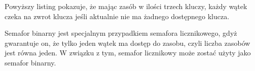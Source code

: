 \documentclass[12pt]{article}
\begin{document}
Powyższy listing pokazuje, że mając zasób w ilości trzech kluczy, każdy wątek czeka na zwrot klucza jeśli aktualnie nie ma żadnego dostępnego klucza.

Semafor binarny jest specjalnym przypadkiem semafora licznikowego, gdyż gwarantuje on, że tylko jeden wątek ma dostęp do zasobu, czyli liczba zasobów jest równa jeden. W związku z tym, semafor licznikowy może zostać użyty jako semafor binarny.
\end{document}
